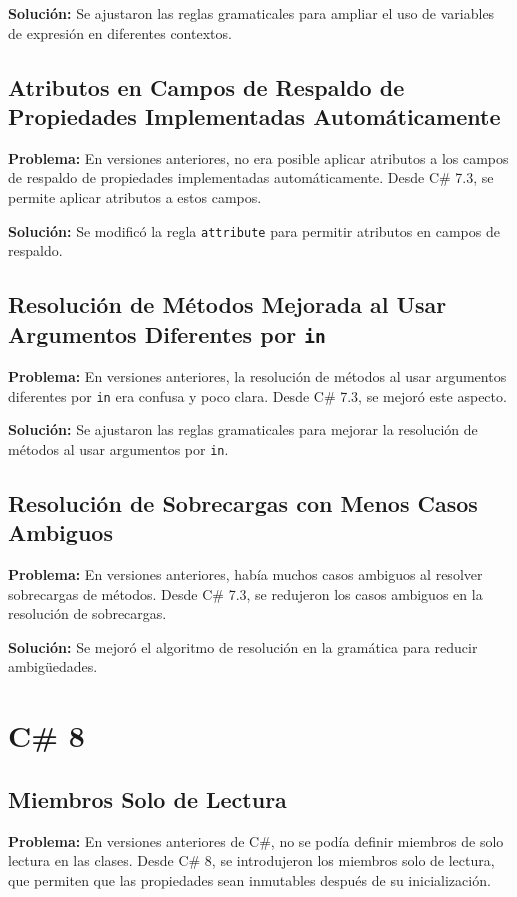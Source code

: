 \textbf{Solución:} Se ajustaron las reglas gramaticales para ampliar el uso de variables de expresión en diferentes contextos.

\subsection{Atributos en Campos de Respaldo de Propiedades Implementadas Automáticamente}
\textbf{Problema:} En versiones anteriores, no era posible aplicar atributos a los campos de respaldo de propiedades implementadas automáticamente. Desde C\# 7.3, se permite aplicar atributos a estos campos.

\textbf{Solución:} Se modificó la regla \texttt{attribute} para permitir atributos en campos de respaldo.

\subsection{Resolución de Métodos Mejorada al Usar Argumentos Diferentes por \texttt{in}}
\textbf{Problema:} En versiones anteriores, la resolución de métodos al usar argumentos diferentes por \texttt{in} era confusa y poco clara. Desde C\# 7.3, se mejoró este aspecto.

\textbf{Solución:} Se ajustaron las reglas gramaticales para mejorar la resolución de métodos al usar argumentos por \texttt{in}.

\subsection{Resolución de Sobrecargas con Menos Casos Ambiguos}
\textbf{Problema:} En versiones anteriores, había muchos casos ambiguos al resolver sobrecargas de métodos. Desde C\# 7.3, se redujeron los casos ambiguos en la resolución de sobrecargas.

\textbf{Solución:} Se mejoró el algoritmo de resolución en la gramática para reducir ambigüedades.

\section{C\# 8}

\subsection{Miembros Solo de Lectura}
\textbf{Problema:} En versiones anteriores de C\#, no se podía definir miembros de solo lectura en las clases. Desde C\# 8, se introdujeron los miembros solo de lectura, que permiten que las propiedades sean inmutables después de su inicialización.

